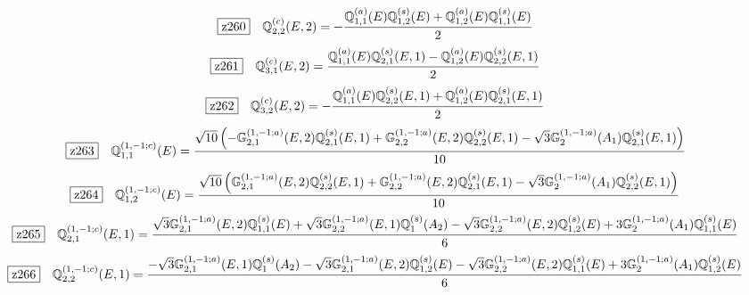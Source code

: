 \documentclass[fleqn,10pt,landscape]{jsarticle}
\begin{document}
\begin{dmath*}
\hspace*{3mm}\fbox{z260}\quad \mathbb{Q}_{2,2}^{(c)}(E,2)=- \frac{\mathbb{Q}_{1,1}^{(a)}(E) \mathbb{Q}_{1,2}^{(s)}(E) + \mathbb{Q}_{1,2}^{(a)}(E) \mathbb{Q}_{1,1}^{(s)}(E)}{2}
\end{dmath*}
\begin{dmath*}
\hspace*{3mm}\fbox{z261}\quad \mathbb{Q}_{3,1}^{(c)}(E,2)=\frac{\mathbb{Q}_{1,1}^{(a)}(E) \mathbb{Q}_{2,1}^{(s)}(E,1) - \mathbb{Q}_{1,2}^{(a)}(E) \mathbb{Q}_{2,2}^{(s)}(E,1)}{2}
\end{dmath*}
\begin{dmath*}
\hspace*{3mm}\fbox{z262}\quad \mathbb{Q}_{3,2}^{(c)}(E,2)=- \frac{\mathbb{Q}_{1,1}^{(a)}(E) \mathbb{Q}_{2,2}^{(s)}(E,1) + \mathbb{Q}_{1,2}^{(a)}(E) \mathbb{Q}_{2,1}^{(s)}(E,1)}{2}
\end{dmath*}
\begin{dmath*}
\hspace*{3mm}\fbox{z263}\quad \mathbb{Q}_{1,1}^{(1,-1;c)}(E)=\frac{\sqrt{10} \left(- \mathbb{G}_{2,1}^{(1,-1;a)}(E,2) \mathbb{Q}_{2,1}^{(s)}(E,1) + \mathbb{G}_{2,2}^{(1,-1;a)}(E,2) \mathbb{Q}_{2,2}^{(s)}(E,1) - \sqrt{3} \mathbb{G}_{2}^{(1,-1;a)}(A_{1}) \mathbb{Q}_{2,1}^{(s)}(E,1)\right)}{10}
\end{dmath*}
\begin{dmath*}
\hspace*{3mm}\fbox{z264}\quad \mathbb{Q}_{1,2}^{(1,-1;c)}(E)=\frac{\sqrt{10} \left(\mathbb{G}_{2,1}^{(1,-1;a)}(E,2) \mathbb{Q}_{2,2}^{(s)}(E,1) + \mathbb{G}_{2,2}^{(1,-1;a)}(E,2) \mathbb{Q}_{2,1}^{(s)}(E,1) - \sqrt{3} \mathbb{G}_{2}^{(1,-1;a)}(A_{1}) \mathbb{Q}_{2,2}^{(s)}(E,1)\right)}{10}
\end{dmath*}
\begin{dmath*}
\hspace*{3mm}\fbox{z265}\quad \mathbb{Q}_{2,1}^{(1,-1;c)}(E,1)=\frac{\sqrt{3} \mathbb{G}_{2,1}^{(1,-1;a)}(E,2) \mathbb{Q}_{1,1}^{(s)}(E) + \sqrt{3} \mathbb{G}_{2,2}^{(1,-1;a)}(E,1) \mathbb{Q}_{1}^{(s)}(A_{2}) - \sqrt{3} \mathbb{G}_{2,2}^{(1,-1;a)}(E,2) \mathbb{Q}_{1,2}^{(s)}(E) + 3 \mathbb{G}_{2}^{(1,-1;a)}(A_{1}) \mathbb{Q}_{1,1}^{(s)}(E)}{6}
\end{dmath*}
\begin{dmath*}
\hspace*{3mm}\fbox{z266}\quad \mathbb{Q}_{2,2}^{(1,-1;c)}(E,1)=\frac{- \sqrt{3} \mathbb{G}_{2,1}^{(1,-1;a)}(E,1) \mathbb{Q}_{1}^{(s)}(A_{2}) - \sqrt{3} \mathbb{G}_{2,1}^{(1,-1;a)}(E,2) \mathbb{Q}_{1,2}^{(s)}(E) - \sqrt{3} \mathbb{G}_{2,2}^{(1,-1;a)}(E,2) \mathbb{Q}_{1,1}^{(s)}(E) + 3 \mathbb{G}_{2}^{(1,-1;a)}(A_{1}) \mathbb{Q}_{1,2}^{(s)}(E)}{6}
\end{dmath*}
\end{document}

